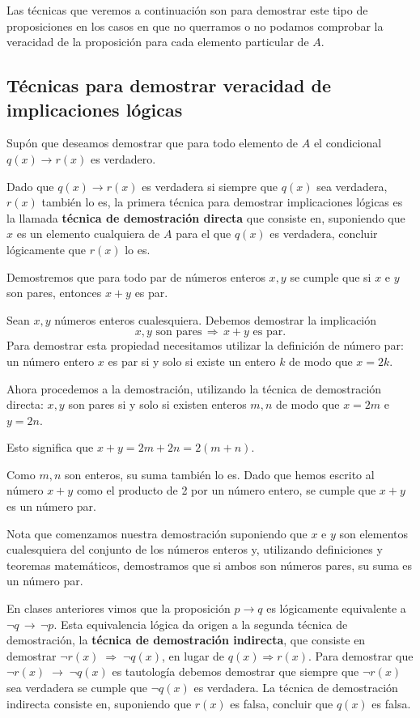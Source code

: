 Las t\'ecnicas que veremos a continuaci\'on son para demostrar
este tipo de proposiciones en los casos en que no 
querramos o no podamos comprobar la veracidad
de la proposici\'on para cada elemento particular de $A$.

\subsection{T\'ecnicas para demostrar veracidad de implicaciones l\'ogicas}

Sup\'on que deseamos demostrar que 
para todo elemento de 
$A$ el condicional $q(x) \rightarrow r(x)$
es verdadero.

Dado que $q(x) \rightarrow r(x)$ es verdadera si siempre que $q(x)$ sea
verdadera, $r(x)$ tambi\'en lo es, la primera t\'ecnica para
demostrar implicaciones l\'ogicas es la llamada \textbf{t\'ecnica
	de demostraci\'on directa} que consiste en, 
suponiendo que $x$ es un elemento cualquiera de $A$ para el que
$q(x)$ es verdadera, concluir l\'ogicamente que $r(x)$ lo es.

\begin{ejemplo}
	Demostremos que para todo par de n\'umeros enteros $x, y$
	se cumple que si $x$ e $y$ son pares, entonces $x+y$ 
	es par.
	
	Sean $x,y$ n\'umeros enteros cualesquiera.
	Debemos demostrar la implicaci\'on
	\[
		x,y \mbox{ son pares}\,\Rightarrow\,x + y\mbox{ es par}.
	\]
	Para demostrar esta propiedad 
	necesitamos utilizar la definici\'on de n\'umero par: 
	un n\'umero entero $x$ es par si y solo si existe un entero
	$k$ de modo que $x=2k$.
	
	Ahora procedemos a la demostraci\'on, utilizando
	la t\'ecnica de demostraci\'on directa:
	$x,y$ son pares si y solo si existen enteros $m, n$ de modo que 
	$x=2m$ e $y=2n$.
	
	Esto significa que $x+y=2m+2n = 2(m+n)$.
	
	Como $m,n$ son enteros, su suma tambi\'en lo es.
	Dado que hemos escrito al n\'umero $x+y$ como el producto
	de 2 por un n\'umero entero, se cumple que $x+y$ es un n\'umero par.
\end{ejemplo}

Nota que comenzamos nuestra demostraci\'on suponiendo que $x$ e $y$
son elementos cualesquiera del conjunto de los n\'umeros
enteros y, utilizando definiciones y teoremas matem\'aticos, demostramos que
si ambos son n\'umeros pares, su suma es un n\'umero par.

En clases anteriores vimos que la proposici\'on $p\rightarrow q$ es l\'ogicamente
equivalente a $
\neg q\,\rightarrow\, 
\neg p$. Esta equivalencia l\'ogica da
origen a la segunda t\'ecnica de demostraci\'on, la \textbf{t\'ecnica
	de demostraci\'on indirecta}, que consiste en
demostrar $
\neg r(x) \;\Rightarrow\; 
\neg q(x)$, en lugar 
de $q(x) \Rightarrow r(x)$.
Para demostrar que $
\neg r(x)\;\rightarrow\;
\neg q(x)$ es tautolog\'ia
debemos demostrar que siempre que $
\neg r(x)$ sea verdadera se cumple que 
$
\neg q(x)$ es verdadera. La t\'ecnica
de demostraci\'on indirecta consiste en, suponiendo que $r(x)$ es falsa,
concluir que $q(x)$ es falsa.

